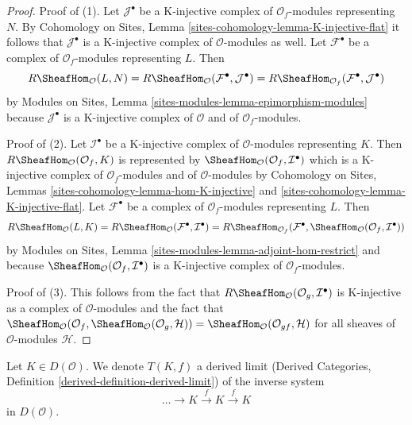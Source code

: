 \begin{proof}
Proof of (1). Let $\mathcal{J}^\bullet$ be a K-injective complex of
$\mathcal{O}_f$-modules representing $N$. By Cohomology on Sites, Lemma
\ref{sites-cohomology-lemma-K-injective-flat} it follows that
$\mathcal{J}^\bullet$ is a K-injective complex of
$\mathcal{O}$-modules as well. Let $\mathcal{F}^\bullet$ be a complex of
$\mathcal{O}_f$-modules representing $L$. Then
$$
R\SheafHom_\mathcal{O}(L, N) =
R\SheafHom_\mathcal{O}(\mathcal{F}^\bullet, \mathcal{J}^\bullet) =
R\SheafHom_{\mathcal{O}_f}(\mathcal{F}^\bullet, \mathcal{J}^\bullet)
$$
by
Modules on Sites, Lemma \ref{sites-modules-lemma-epimorphism-modules}
because $\mathcal{J}^\bullet$ is a K-injective complex of $\mathcal{O}$
and of $\mathcal{O}_f$-modules.

\medskip\noindent
Proof of (2). Let $\mathcal{I}^\bullet$ be a K-injective complex of
$\mathcal{O}$-modules representing $K$.
Then $R\SheafHom_\mathcal{O}(\mathcal{O}_f, K)$ is represented by
$\SheafHom_\mathcal{O}(\mathcal{O}_f, \mathcal{I}^\bullet)$ which is
a K-injective complex of $\mathcal{O}_f$-modules and of
$\mathcal{O}$-modules by
Cohomology on Sites, Lemmas \ref{sites-cohomology-lemma-hom-K-injective} and
\ref{sites-cohomology-lemma-K-injective-flat}.
Let $\mathcal{F}^\bullet$ be a complex of $\mathcal{O}_f$-modules
representing $L$. Then
$$
R\SheafHom_\mathcal{O}(L, K) =
R\SheafHom_\mathcal{O}(\mathcal{F}^\bullet, \mathcal{I}^\bullet) =
R\SheafHom_{\mathcal{O}_f}(\mathcal{F}^\bullet,
\SheafHom_\mathcal{O}(\mathcal{O}_f, \mathcal{I}^\bullet))
$$
by Modules on Sites, Lemma \ref{sites-modules-lemma-adjoint-hom-restrict}
and because $\SheafHom_\mathcal{O}(\mathcal{O}_f, \mathcal{I}^\bullet)$ is a
K-injective complex of $\mathcal{O}_f$-modules.

\medskip\noindent
Proof of (3). This follows from the fact that
$R\SheafHom_\mathcal{O}(\mathcal{O}_g, \mathcal{I}^\bullet)$
is K-injective as a complex of $\mathcal{O}$-modules and the fact that
$\SheafHom_\mathcal{O}(\mathcal{O}_f,
\SheafHom_\mathcal{O}(\mathcal{O}_g, \mathcal{H})) =
\SheafHom_\mathcal{O}(\mathcal{O}_{gf}, \mathcal{H})$
for all sheaves of $\mathcal{O}$-modules $\mathcal{H}$.
\end{proof}

Let $K \in D(\mathcal{O})$. We denote
$T(K, f)$ a derived limit (Derived Categories, Definition
\ref{derived-definition-derived-limit}) of the inverse system
$$
\ldots \to K \xrightarrow{f} K \xrightarrow{f} K
$$
in $D(\mathcal{O})$.


